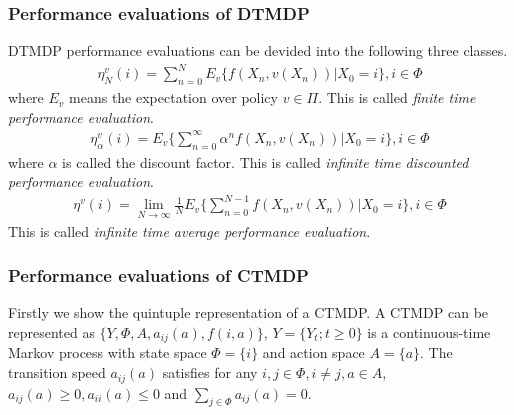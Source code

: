 \documentclass[runningheads]{llncs}
\begin{document}
    \subsubsection{Performance evaluations of DTMDP}
    DTMDP performance evaluations can be devided into the following three classes.
    \begin{align}
        \eta_N^v(i) = \sum_{n=0}^N E_v \{ f(X_n, v(X_n)) | X_0 = i \}, i \in \Phi
    \end{align}
    where $E_v$ means the expectation over policy $v \in \Pi$. This is called \emph{finite
    time performance evaluation}.
    \begin{align}
        \eta_\alpha^v(i) = E_v \{ \sum_{n=0}^\infty \alpha^n f(X_n, v(X_n)) | X_0 = i \}, i \in \Phi
    \end{align}
    where $\alpha$ is called the discount factor. This is called \emph{infinite time
    discounted performance evaluation}.
    \begin{align}
        \eta^v(i) = \mathop{\lim}_{N\rightarrow\infty} \frac{1}{N} E_v \{ \sum_{n=0}^{N-1} f(X_n, v(X_n)) | X_0 = i \}, i \in \Phi
    \end{align}
    This is called \emph{infinite time average performance evaluation}.

    \subsubsection{Performance evaluations of CTMDP}
    Firstly we show the quintuple representation of a CTMDP.
    A CTMDP can be represented as $\{ Y, \Phi, A, a_{ij}(a), f(i, a) \}$,
    $Y = \{ Y_t; t \geq 0 \}$ is a continuous-time Markov process with
    state space $\Phi = \{ i \}$ and action space $A = \{a\}$.
    The transition speed $a_{ij}(a)$ satisfies for any $i, j \in \Phi, i \neq j, a \in A$,
    $a_{ij}(a) \geq 0, a_{ii}(a) \leq 0$ and $\sum_{j \in \Phi} a_{ij}(a) = 0$.
\end{document}
